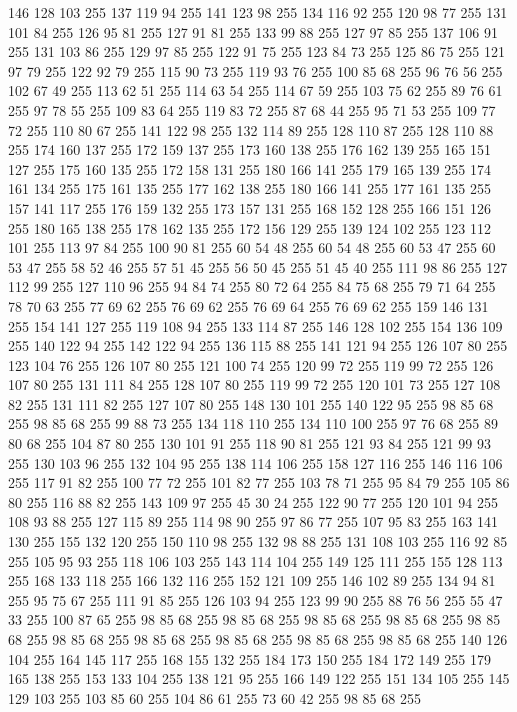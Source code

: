 146 128 103 255 137 119 94 255 141 123 98 255 134 116 92 255 120 98 77 255 131 101 84 255 126 95 81 255 127 91 81 255 133 99 88 255 127 97 85 255 137 106 91 255 131 103 86 255 129 97 85 255 122 91 75 255 123 84 73 255 125 86 75 255 121 97 79 255 122 92 79 255 115 90 73 255 119 93 76 255 100 85 68 255 96 76 56 255 102 67 49 255 113 62 51 255 114 63 54 255 114 67 59 255 103 75 62 255 89 76 61 255 97 78 55 255 109 83 64 255 119 83 72 255 87 68 44 255 95 71 53 255 109 77 72 255 110 80 67 255 141 122 98 255 132 114 89 255 128 110 87 255 128 110 88 255 174 160 137 255 172 159 137 255 173 160 138 255 176 162 139 255 165 151 127 255 175 160 135 255 172 158 131 255 180 166 141 255 179 165 139 255 174 161 134 255 175 161 135 255 177 162 138 255 180 166 141 255 177 161 135 255 157 141 117 255 176 159 132 255 173 157 131 255 168 152 128 255 166 151 126 255 180 165 138 255 178 162 135 255 172 156 129 255 139 124 102 255 123 112 101 255 113 97 84 255
100 90 81 255 60 54 48 255 60 54 48 255 60 53 47 255 60 53 47 255 58 52 46 255 57 51 45 255 56 50 45 255 51 45 40 255 111 98 86 255 127 112 99 255 127 110 96 255 94 84 74 255 80 72 64 255 84 75 68 255 79 71 64 255 78 70 63 255 77 69 62 255 76 69 62 255 76 69 64 255 76 69 62 255 159 146 131 255 154 141 127 255 119 108 94 255 133 114 87 255 146 128 102 255 154 136 109 255 140 122 94 255 142 122 94 255 136 115 88 255 141 121 94 255 126 107 80 255 123 104 76 255 126 107 80 255 121 100 74 255 120 99 72 255 119 99 72 255 126 107 80 255 131 111 84 255 128 107 80 255 119 99 72 255 120 101 73 255 127 108 82 255 131 111 82 255 127 107 80 255 148 130 101 255 140 122 95 255 98 85 68 255 98 85 68 255 99 88 73 255 134 118 110 255 134 110 100 255 97 76 68 255 89 80 68 255 104 87 80 255 130 101 91 255 118 90 81 255 121 93 84 255 121 99 93 255 130 103 96 255 132 104 95 255 138 114 106 255 158 127 116 255 146 116 106 255
117 91 82 255 100 77 72 255 101 82 77 255 103 78 71 255 95 84 79 255 105 86 80 255 116 88 82 255 143 109 97 255 45 30 24 255 122 90 77 255 120 101 94 255 108 93 88 255 127 115 89 255 114 98 90 255 97 86 77 255 107 95 83 255 163 141 130 255 155 132 120 255 150 110 98 255 132 98 88 255 131 108 103 255 116 92 85 255 105 95 93 255 118 106 103 255 143 114 104 255 149 125 111 255 155 128 113 255 168 133 118 255 166 132 116 255 152 121 109 255 146 102 89 255 134 94 81 255 95 75 67 255 111 91 85 255 126 103 94 255 123 99 90 255 88 76 56 255 55 47 33 255 100 87 65 255 98 85 68 255 98 85 68 255 98 85 68 255 98 85 68 255 98 85 68 255 98 85 68 255 98 85 68 255 98 85 68 255 98 85 68 255 98 85 68 255 140 126 104 255 164 145 117 255 168 155 132 255 184 173 150 255 184 172 149 255 179 165 138 255 153 133 104 255 138 121 95 255 166 149 122 255 151 134 105 255 145 129 103 255 103 85 60 255 104 86 61 255 73 60 42 255 98 85 68 255
